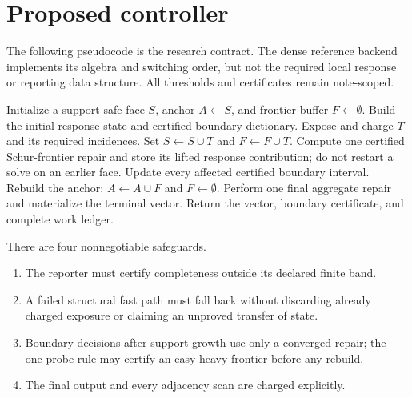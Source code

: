 \section{Proposed controller}
\label{sec:algorithm}

The following pseudocode is the research contract.  The dense reference backend
implements its algebra and switching order, but not the required local response
or reporting data structure.  All thresholds and certificates remain
note-scoped.

\begin{algorithm}[h]
\caption{Response-preconditioned nested continuation}
\label{alg:response-preconditioned}
\begin{algorithmic}[1]
\STATE Initialize a support-safe face $S$, anchor $A\gets S$, and frontier
buffer $F\gets\emptyset$.
\STATE Build the initial response state and certified boundary dictionary.
    \STATE Expose and charge $T$ and its required incidences.
    \STATE Set $S\gets S\cup T$ and $F\gets F\cup T$.
    \STATE Compute one certified Schur-frontier repair and store its lifted
      response contribution; do not restart a solve on an earlier face.
    \STATE Update every affected certified boundary interval.
        \STATE Rebuild the anchor: $A\gets A\cup F$ and $F\gets\emptyset$.
    \ENDIF
\ENDWHILE
\STATE Perform one final aggregate repair and materialize the terminal vector.
\STATE Return the vector, boundary certificate, and complete work ledger.
\end{algorithmic}
\end{algorithm}

There are four nonnegotiable safeguards.

\begin{enumerate}
\item The reporter must certify completeness outside its declared finite band.
\item A failed structural fast path must fall back without discarding already
      charged exposure or claiming an unproved transfer of state.
\item Boundary decisions after support growth use only a converged repair; the
      one-probe rule may certify an easy heavy frontier before any rebuild.
\item The final output and every adjacency scan are charged explicitly.
\end{enumerate}

